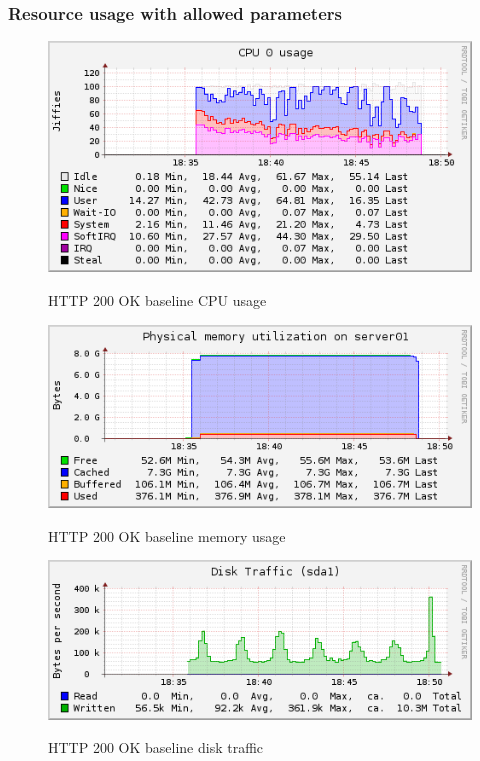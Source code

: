 \documentclass[Measurement results]{subfiles}
\begin{document}
\subsubsection{Resource usage with allowed parameters}
\begin{figure}[H]
\centering
\caption{HTTP 200 OK baseline CPU usage}
\includegraphics[scale=0.7]{images/results/200_with_naxsi_incremented_allowed_parameters/cpu.png}
\label{fig:Baseline Nginx CPU usage}
\end{figure}

\begin{figure}[H]
\centering
\caption{HTTP 200 OK baseline memory usage}
\includegraphics[scale=0.7]{images/results/200_with_naxsi_incremented_allowed_parameters/memory.png}
\label{fig:Baseline Nginx memory usage}
\end{figure}

\begin{figure}[H]
\centering
\caption{HTTP 200 OK baseline disk traffic}
\includegraphics[scale=0.7]{images/results/200_with_naxsi_incremented_allowed_parameters/disk.png}
\label{fig:Baseline Nginx disk traffic}
\end{figure}
\end{document}
